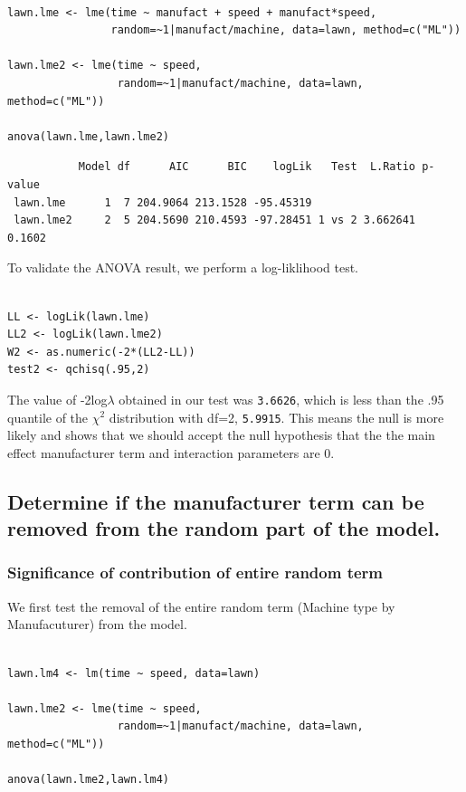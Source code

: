 \documentclass[11pt]{article}
\begin{document}
\begin{verbatim}

lawn.lme <- lme(time ~ manufact + speed + manufact*speed, 
                random=~1|manufact/machine, data=lawn, method=c("ML"))

lawn.lme2 <- lme(time ~ speed, 
                 random=~1|manufact/machine, data=lawn, method=c("ML"))

anova(lawn.lme,lawn.lme2)
\end{verbatim}

\begin{verbatim}
           Model df      AIC      BIC    logLik   Test  L.Ratio p-value
 lawn.lme      1  7 204.9064 213.1528 -95.45319                        
 lawn.lme2     2  5 204.5690 210.4593 -97.28451 1 vs 2 3.662641  0.1602
\end{verbatim}

To validate the ANOVA result, we perform a log-liklihood test.


\begin{verbatim}

LL <- logLik(lawn.lme)
LL2 <- logLik(lawn.lme2)
W2 <- as.numeric(-2*(LL2-LL))
test2 <- qchisq(.95,2)
\end{verbatim}


The value of -2log$\lambda$ obtained in our test was
\texttt{3.6626}, which is less than the .95
quantile of the $\chi$$^2$ distribution with df=2, 
\texttt{5.9915}. This means the null is more
likely and shows that we should accept the null hypothesis that the 
the main effect manufacturer term and interaction parameters are 0. 
\subsection{Determine if the manufacturer term can be removed from the random part of the model.}
\label{sec-2-3}
\subsubsection{Significance of contribution of entire random term}
\label{sec-2-3-1}

We first test the removal of the entire random term (Machine type by
Manufacuturer) from the model.



\begin{verbatim}

lawn.lm4 <- lm(time ~ speed, data=lawn)

lawn.lme2 <- lme(time ~ speed, 
                 random=~1|manufact/machine, data=lawn, method=c("ML"))  

anova(lawn.lme2,lawn.lm4)
\end{verbatim}
\end{document}
